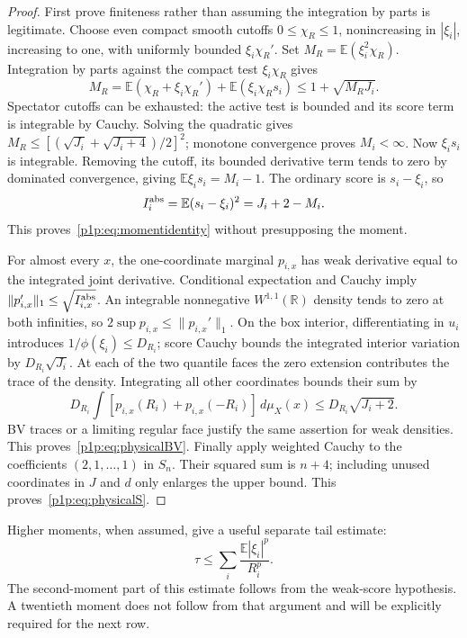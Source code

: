 \documentclass[11pt]{article}
\numberwithin{equation}{section}
\theoremstyle{definition}
\theoremstyle{remark}
\begin{document}
\begin{proof}
First prove finiteness rather than assuming the integration by parts is
legitimate. Choose even compact smooth cutoffs $0\leq\chi_R\leq1$,
nonincreasing in $|\xi_i|$, increasing to one, with uniformly bounded
$\xi_i\chi_R'$. Set $M_R=\mathbb E(\xi_i^2\chi_R)$.
Integration by parts against the compact test $\xi_i\chi_R$ gives
\[
 M_R=\mathbb E(\chi_R+\xi_i\chi_R')+
       \mathbb E(\xi_i\chi_Rs_i)
 \leq1+\sqrt{M_RJ_i}.
\]
Spectator cutoffs can be exhausted: the active test is bounded and
its score term is integrable by Cauchy. Solving the quadratic gives
$M_R\leq[(\sqrt{J_i}+\sqrt{J_i+4})/2]^2$; monotone convergence proves
$M_i<\infty$. Now $\xi_i s_i$ is integrable. Removing the cutoff, its
bounded derivative term tends to zero by dominated convergence, giving
$\mathbb E\xi_i s_i=M_i-1$. The ordinary score is $s_i-\xi_i$, so
\[
 I_i^{\rm abs}=\mathbb E(s_i-\xi_i)^2=J_i+2-M_i.
\]
This proves~\eqref{p1p:eq:momentidentity} without presupposing the moment.

For almost every $x$, the one-coordinate marginal $p_{i,x}$ has weak
derivative equal to the integrated joint derivative. Conditional
expectation and Cauchy imply
$\|p_{i,x}'\|_1\leq\sqrt{I_{i,x}^{\rm abs}}$.
An integrable nonnegative $W^{1,1}(\mathbb R)$ density tends to zero at
both infinities, so
$2\sup p_{i,x}\leq\|p_{i,x}'\|_1$.
On the box interior, differentiating in $u_i$ introduces
$1/\phi(\xi_i)\leq D_{R_i}$; score Cauchy bounds the integrated interior
variation by $D_{R_i}\sqrt{J_i}$.
At each of the two quantile faces the zero extension contributes the
trace of the density. Integrating all other coordinates bounds their
sum by
\[
 D_{R_i}\int[p_{i,x}(R_i)+p_{i,x}(-R_i)]\,d\mu_X(x)
 \leq D_{R_i}\sqrt{J_i+2}.
\]
BV traces or a limiting regular face justify the same assertion for weak
densities. This proves~\eqref{p1p:eq:physicalBV}. Finally apply weighted
Cauchy to the coefficients $(2,1,\ldots,1)$ in $S_n$. Their squared sum
is $n+4$; including unused coordinates in $J$ and $d$ only enlarges the
upper bound. This proves~\eqref{p1p:eq:physicalS}.
\end{proof}

Higher moments, when assumed, give a useful separate tail estimate:
\begin{equation}\label{p1p:eq:tail}
 \tau\leq\sum_i\frac{\mathbb E|\xi_i|^p}{R_i^p}.
\end{equation}
The second-moment part of this estimate follows from the weak-score
hypothesis. A twentieth moment does not follow from that argument and
will be explicitly required for the next row.
\end{document}
